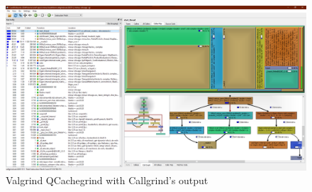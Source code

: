 \begin{figure}[H]
    \includegraphics[width=\columnwidth]{figs/valgrind_qcachegrind_callgrind}
    \caption{Valgrind QCachegrind with Callgrind's output}
\end{figure}

